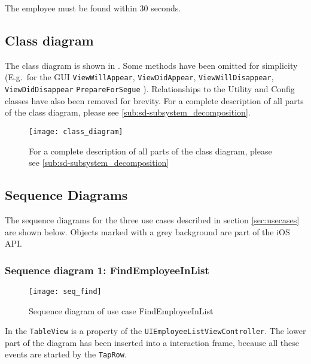 \usecaseline

\begin{description}[style=multiline,leftmargin=4cm,font=\normalfont]
    \item[\emph{Quality requirements}]
  The employee must be found within 30 seconds.
\end{description}

\usecasethickline

\bigskip

\subsection{Class diagram}
The class diagram is shown in . Some methods have been omitted for simplicity
(E.g.\ for the GUI \texttt{ViewWillAppear}, \texttt{ViewDidAppear}, \texttt{ViewWillDisappear}, \texttt{ViewDidDisappear} \texttt{PrepareForSegue} \@).
Relationships to the Utility and Config classes have also been removed for brevity. For a complete description
of all parts of the class diagram, please see \autoref{sub:sd-subsystem_decomposition}.

\begin{sidewaysfigure}
    \texttt{[image: class\_diagram]}
    \caption{For a complete description of all parts of the class diagram,
        please see \autoref{sub:sd-subsystem_decomposition}}
    \label{fig:decomp-class_diagram}
\end{sidewaysfigure}

\newpage
\subsection{Sequence Diagrams}

The sequence diagrams for the three use cases described in section \ref{sec:usecases} are shown below. Objects marked with a grey background are part of the iOS API.

\subsubsection{Sequence diagram 1: FindEmployeeInList}

\begin{figure}[h!]
    \centerline{\texttt{[image: seq\_find]}}
    \caption{Sequence diagram of use case FindEmployeeInList}
    \label{fig:uc1}
\end{figure}

In  the \texttt{TableView} is a property of the \texttt{UIEmployeeListViewController}. The lower part of the diagram has been inserted into a interaction frame, because all these events are started by the \texttt{TapRow}.

